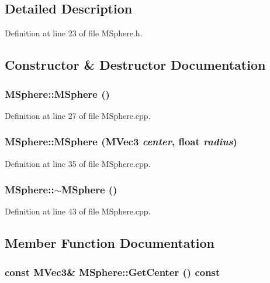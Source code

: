 \subsection{Detailed Description}


Definition at line 23 of file MSphere.h.

\subsection{Constructor \& Destructor Documentation}
\hypertarget{class_m_sphere_0027be61e6778e87d461fa9c9cc12edb}{
\subsubsection[{MSphere}]{\setlength{\rightskip}{0pt plus 5cm}MSphere::MSphere ()}}
\label{class_m_sphere_0027be61e6778e87d461fa9c9cc12edb}




Definition at line 27 of file MSphere.cpp.\hypertarget{class_m_sphere_1a1b2f1118f6abde66f918cda8c5a7ae}{
\subsubsection[{MSphere}]{\setlength{\rightskip}{0pt plus 5cm}MSphere::MSphere ({\bf MVec3} {\em center}, \/  float {\em radius})}}
\label{class_m_sphere_1a1b2f1118f6abde66f918cda8c5a7ae}




Definition at line 35 of file MSphere.cpp.\hypertarget{class_m_sphere_adb549c6f1620d450c050419ccefde72}{
\subsubsection[{$\sim$MSphere}]{\setlength{\rightskip}{0pt plus 5cm}MSphere::$\sim$MSphere ()}}
\label{class_m_sphere_adb549c6f1620d450c050419ccefde72}




Definition at line 43 of file MSphere.cpp.

\subsection{Member Function Documentation}
\hypertarget{class_m_sphere_64551ac188c0149a539f608203060ce0}{
\subsubsection[{GetCenter}]{\setlength{\rightskip}{0pt plus 5cm}const {\bf MVec3}\& MSphere::GetCenter () const}}
\label{class_m_sphere_64551ac188c0149a539f608203060ce0}




